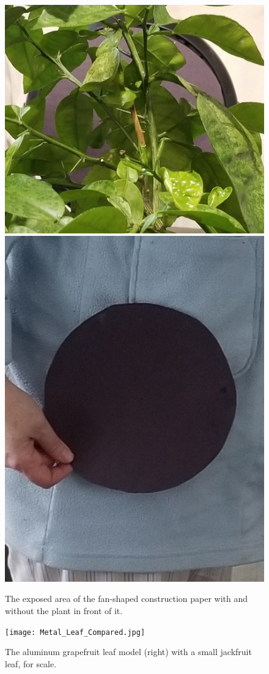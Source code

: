 \documentclass{article}
\begin{document}
\begin{figure}
\begin{center}
\includegraphics[width=0.33\columnwidth]{Fan.jpg}
\includegraphics[width=0.33\columnwidth]{Fan1.jpg}
\end{center}
\caption{The exposed area of the fan-shaped construction paper with and without the plant in front of it.}
\label{fig:methods2}
\end{figure}

\begin{figure}
\begin{center}
\texttt{[image: Metal\_Leaf\_Compared.jpg]}
\end{center}
\caption{The aluminum grapefruit leaf model (right) with a small jackfruit leaf, for scale.}
\label{fig:methods3}
\end{figure}
\end{document}
